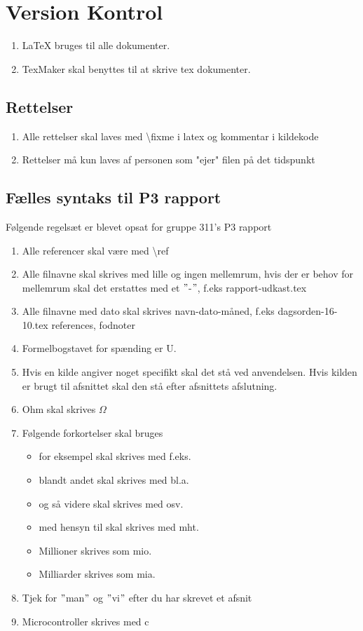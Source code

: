 \section{Version Kontrol}
\begin{enumerate}
\item{LaTeX bruges til alle dokumenter.}
\item TexMaker skal benyttes til at skrive tex dokumenter.
\end{enumerate}
\subsection{Rettelser}
\begin{enumerate}
\item Alle rettelser skal laves med \textbackslash fixme i latex og kommentar i kildekode
\item Rettelser må kun laves af personen som "ejer" filen på det tidspunkt
\end{enumerate}
\subsection{Fælles syntaks til P3 rapport}
Følgende regelsæt er blevet opsat for gruppe 311's P3 rapport

\begin{enumerate}
\item Alle referencer skal være med \textbackslash ref
\item Alle filnavne skal skrives med lille og ingen mellemrum, hvis der er behov for mellemrum skal det erstattes med et $"$-$"$, f.eks rapport-udkast.tex
\item Alle filnavne med dato skal skrives navn-dato-måned, f.eks dagsorden-16-10.tex
references, fodnoter
\item Formelbogstavet for spænding er U.
\item Hvis en kilde angiver noget specifikt skal det stå ved anvendelsen. Hvis kilden er brugt til afsnittet skal den stå efter afsnittets afslutning.
\item Ohm skal skrives $\Omega$
\item Følgende forkortelser skal bruges
\begin{itemize}
\item for eksempel skal skrives med f.eks.
\item blandt andet skal skrives med bl.a.
\item og så videre skal skrives med osv. 
\item med hensyn til skal skrives med mht.
\item Millioner skrives som mio.
\item Milliarder skrives som mia.
\end{itemize}
\item Tjek for $"$man$"$ og $"$vi$"$ efter du har skrevet et afsnit
\item Microcontroller skrives med c
\end{enumerate}

